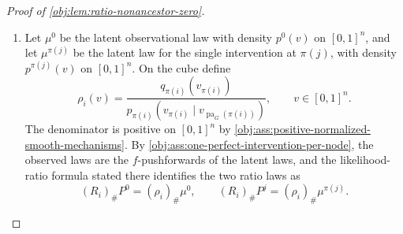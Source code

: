 \documentclass[11pt]{article}
\begin{document}
\begin{proof}[Proof of \cref{obj:lem:ratio-nonancestor-zero}]
\begin{enumerate}
\item Let \(\mu^0\) be the latent observational law with density \(p^0(v)\) on \([0,1]^n\), and let \(\mu^{\pi(j)}\) be the latent law for the single intervention at \(\pi(j)\), with density \(p^{\pi(j)}(v)\) on \([0,1]^n\).  On the cube define
\[
\rho_i(v)
=
\frac{q_{\pi(i)}(v_{\pi(i)})}
{p_{\pi(i)}(v_{\pi(i)}\mid v_{\operatorname{pa}_G(\pi(i))})},
\qquad v\in[0,1]^n .
\]
The denominator is positive on \([0,1]^n\) by \cref{obj:ass:positive-normalized-smooth-mechanisms}.  By \cref{obj:ass:one-perfect-intervention-per-node}, the observed laws are the \(f\)-pushforwards of the latent laws, and the likelihood-ratio formula stated there identifies the two ratio laws as
\[
(R_i)_\#P^0=(\rho_i)_\#\mu^0,
\qquad
(R_i)_\#P^j=(\rho_i)_\#\mu^{\pi(j)} .
\]


\end{enumerate}
\end{proof}
\end{document}
